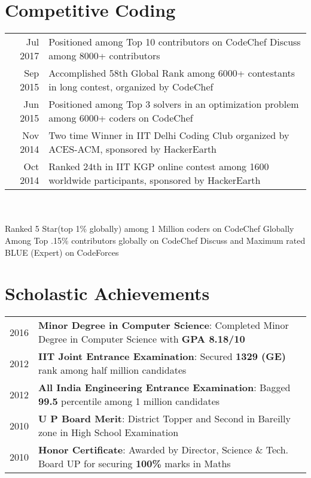 \documentclass[a4paper,10pt]{article}
\begin{document}
\section{Competitive Coding}
\begin{tabular}{r|p{16cm}}	

Jul 2017 & Positioned among Top 10 contributors on CodeChef Discuss among 8000+ contributors\\
Sep 2015 & Accomplished 58th Global Rank among 6000+ contestants in long contest, organized by CodeChef\\
Jun 2015 & Positioned among Top 3 solvers in an optimization problem among 6000+ coders on CodeChef\\
Nov 2014 & Two time Winner in IIT Delhi Coding Club organized by ACES-ACM, sponsored by HackerEarth\\
Oct 2014 & Ranked 24th in IIT KGP online contest among 1600 worldwide participants, sponsored by HackerEarth\\
\end{tabular}\\\\
Ranked 5 Star(top 1\% globally) among 1 Million coders on CodeChef Globally\\
Among Top .15\% contributors globally on CodeChef Discuss and Maximum rated BLUE (Expert) on CodeForces\\

\section{Scholastic Achievements}
\begin{tabular}{r|p{16cm}}	

2016 & \textbf{Minor Degree in Computer Science}: Completed Minor Degree in Computer Science with \textbf{GPA 8.18/10}\\
2012 & \textbf{IIT Joint Entrance Examination}: Secured \textbf{1329 (GE)} rank among half million candidates\\
2012 & \textbf{All India Engineering Entrance Examination}: Bagged \textbf{99.5} percentile among 1 million candidates\\
2010 & \textbf{U P Board Merit}: District Topper and Second in Bareilly zone in High School Examination\\
2010 & \textbf{Honor Certificate}: Awarded by Director, Science \& Tech. Board UP for securing \textbf{100\%} marks in Maths\\

\end{tabular}
\end{document}
